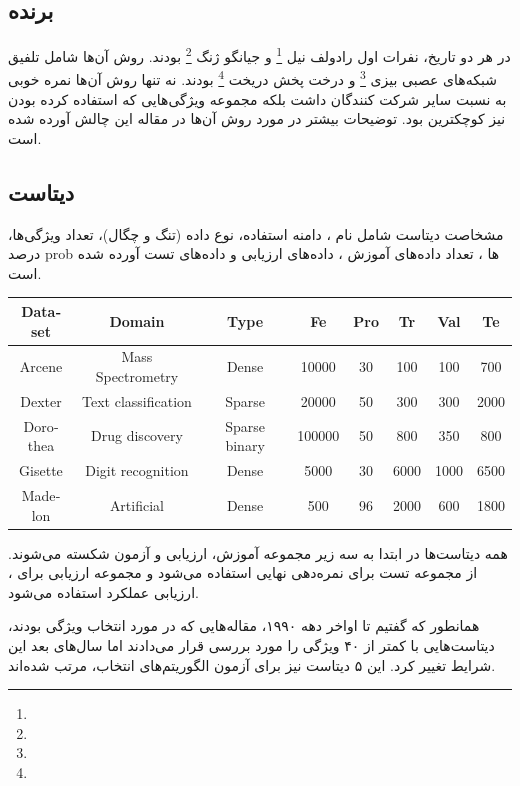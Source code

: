 \documentclass[a4paper, 12pt]{article}
\begin{document}
\subsection*{برنده}
در هر دو تاریخ، نفرات اول
رادولف نیل 
\footnote{}
و
جیانگو ژنگ
\footnote{} 
 بودند. روش آن‌ها شامل تلفیق شبکه‌های عصبی بیزی
 \footnote{}
 و درخت پخش دریخت
 \footnote{}
 بودند. نه تنها روش آن‌ها نمره خوبی به نسبت سایر شرکت کنندگان داشت بلکه مجموعه ویژگی‌هایی که استفاده کرده بودن نیز کوچکترین بود. توضیحات بیشتر در مورد روش آن‌ها در مقاله این چالش آورده شده است.
 
 
\subsection*{دیتاست}
مشخاصت دیتاست شامل نام ، دامنه استفاده، نوع داده (تنگ و چگال)، تعداد ویژگی‌ها، درصد prob ‌ها 
، تعداد داده‌های آموزش ، داده‌های ارزیابی و داده‌های تست آورده شده است.
\begin{latin}
	\begin{center}
		\begin{tabular}{|c|c|c|c|c|c|c|c|}
			\hline
			Dataset & Domain & Type & Fe  & Pro  & Tr  & Val  & Te \\\hline
			
			Arcene& Mass Spectrometry &Dense &10000 &30 &100& 100 &700
			\\\hline
			Dexter &Text classification& Sparse &20000& 50& 300 &300& 2000
			\\\hline
			Dorothea& Drug discovery &Sparse binary &100000 &50 &800& 350& 800
			\\\hline
			Gisette& Digit recognition &Dense& 5000& 30 &6000& 1000& 6500
			\\\hline
			Madelon &Artificial &Dense& 500 &96 &2000 &600 &1800
			\\\hline
		\end{tabular}
	\end{center}
\end{latin} 

همه دیتاست‌ها در ابتدا به سه زیر مجموعه آموزش، ارزیابی و آزمون شکسته می‌شوند. از مجموعه تست برای نمره‌دهی نهایی استفاده می‌شود و مجموعه ارزیابی برای ، ارزیابی  عملکرد استفاده می‌شود.

همانطور که گفتیم تا اواخر دهه ۱۹۹۰، مقاله‌هایی که در مورد انتخاب ویژگی بودند، دیتاست‌هایی با کمتر از ۴۰ ویژگی را مورد بررسی قرار می‌دادند اما سال‌های بعد این شرایط تغییر کرد. این ۵ دیتاست نیز برای آزمون الگوریتم‌های انتخاب، مرتب شده‌اند. 
\end{document}
